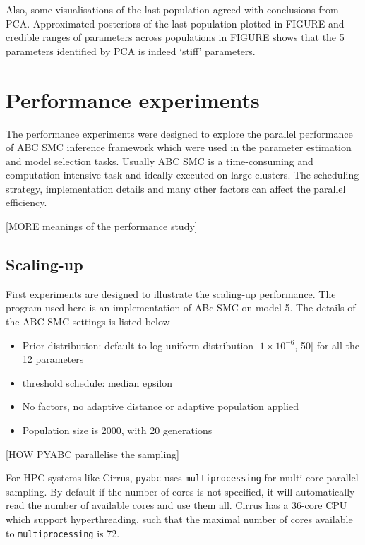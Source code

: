\documentclass[12pt,a4paper]{report}
\begin{document}
Also, some visualisations of the last population agreed with conclusions from PCA. Approximated posteriors of the last population plotted in FIGURE and credible ranges of parameters across populations in FIGURE shows that the 5 parameters identified by PCA is indeed `stiff' parameters.












\chapter{Performance experiments}

The performance experiments were designed to explore the parallel performance of ABC SMC inference framework which were used in the parameter estimation and model selection tasks. Usually ABC SMC is a time-consuming and computation intensive task and ideally executed on large clusters. The scheduling strategy, implementation details and many other factors can affect the parallel efficiency.

[MORE meanings of the performance study]

\section{Scaling-up}

First experiments are designed to illustrate the scaling-up performance. The program used here is an implementation of ABc SMC on model 5. The details of the ABC SMC settings is listed below

\begin{itemize}
    \item Prior distribution: default to log-uniform distribution [$1\times 10^{-6}$, 50] for all the 12 parameters
    \item threshold schedule: median epsilon
    \item No factors, no adaptive distance or adaptive population applied
    \item Population size is 2000, with 20 generations
\end{itemize}

[HOW PYABC parallelise the sampling]

For HPC systems like Cirrus, \verb|pyabc| uses \verb|multiprocessing| for multi-core parallel sampling. By default if the number of cores is not specified, it will automatically read the number of available cores and use them all. Cirrus has a 36-core CPU which support hyperthreading, such that the maximal number of cores available to \verb|multiprocessing| is 72.
\end{document}
